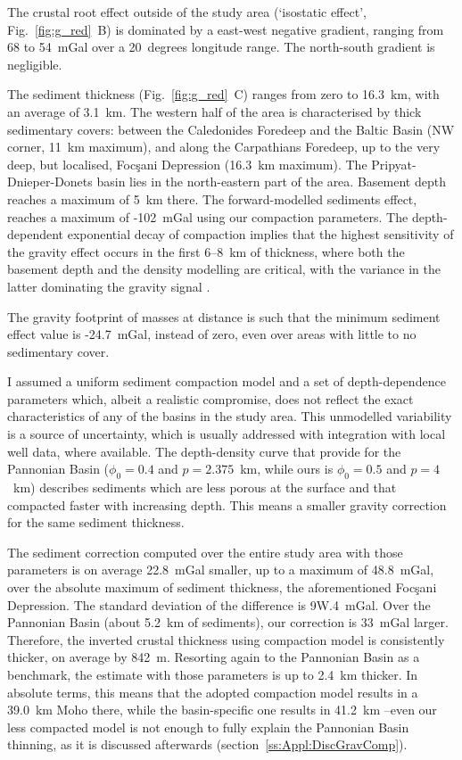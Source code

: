 The crustal root effect outside of the study area (`isostatic effect', Fig.~\ref{fig:g_red}~B) is dominated by a east-west negative gradient, ranging from 68 to 54~mGal over a 20~degrees longitude range.
The north-south gradient is negligible.

The sediment thickness (Fig.~\ref{fig:g_red}~C) ranges from zero to 16.3~\si{\kilo \metre}, with an average of 3.1~\si{\kilo \metre}.
The western half of the area is characterised by thick sedimentary covers: between the Caledonides Foredeep and the Baltic Basin (NW corner, 11~\si{\kilo \metre} maximum), and along the Carpathians Foredeep, up to the very deep, but localised, Focşani Depression (16.3~\si{\kilo \metre} maximum).
The Pripyat-Dnieper-Donets basin lies in the north-eastern part of the area.
Basement depth reaches a maximum of 5~\si{\kilo \metre} there.
The forward-modelled sediments effect, reaches a maximum of -102~mGal using our compaction parameters.
The depth-dependent exponential decay of compaction implies that the highest sensitivity of the gravity effect occurs in the first 6--8~\si{\kilo \metre} of thickness, where both the basement depth and the density modelling are critical, with the variance in the latter dominating the gravity signal \parencite{Kaban2010}.

The gravity footprint of masses at distance is such that the minimum sediment effect value is -24.7~mGal, instead of zero, even over areas with little to no sedimentary cover.

I assumed a uniform sediment compaction model and a set of depth-dependence parameters which, albeit a realistic compromise, does not reflect the exact characteristics of any of the basins in the study area.
This unmodelled variability is a source of uncertainty, which is usually addressed with integration with local well data, where available.
The depth-density curve that \textcite{Kaban2010} provide for the Pannonian Basin ($\phi_0 = 0.4$ and $p = 2.375$~{km}, while ours is $\phi_0 = 0.5$ and $p = 4$~{km}) describes sediments which are less porous at the surface and that compacted faster with increasing depth.
This means a smaller gravity correction for the same sediment thickness.

The sediment correction computed over the entire study area with those parameters is on average 22.8~mGal smaller, up to a maximum of 48.8~mGal, over the absolute maximum of sediment thickness, the aforementioned Focşani Depression.
The standard deviation of the difference is 9W.4~mGal.
Over the Pannonian Basin (about 5.2~\si{\kilo \metre} of sediments), our correction is 33~mGal larger.
Therefore, the inverted crustal thickness using \textcite{Kaban2010} compaction model is consistently thicker, on average by 842~m.
Resorting again to the Pannonian Basin as a benchmark, the estimate with those parameters is up to 2.4~\si{\kilo \metre} thicker.
In absolute terms, this means that the adopted compaction model results in a 39.0~\si{\kilo \metre} Moho there, while the basin-specific one results in 41.2~\si{\kilo \metre} --even our less compacted model is not enough to fully explain the Pannonian Basin thinning, as it is discussed afterwards (section~\ref{ss:Appl:DiscGravComp}).

